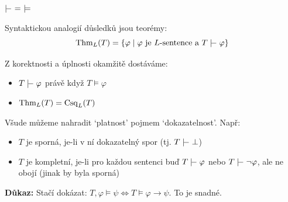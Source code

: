 \documentclass{beamer}
\begin{document}
\begin{frame}{$\proves\ =\ \models$}

    \pause
    Syntaktickou analogií \alert{důsledků} jsou \alert{teorémy}:
    $$
    \Thm_L(T)=\{\varphi\mid \varphi\text{ je $L$-sentence a } T\proves\varphi\}
    $$
    
    \pause
    Z korektnosti a úplnosti okamžitě dostáváme:
        \begin{itemize}
            \item $T\proves\varphi$ právě když $T\models\varphi$
            \item $\operatorname{Thm}_L(T)=\operatorname{Csq}_L(T)$
        \end{itemize}
    
    \pause
    Všude můžeme nahradit `\alert{platnost}' pojmem `\alert{dokazatelnost}'.  Např:
    \begin{itemize}
        \item $T$ je \alert{sporná}, je-li v ní dokazatelný spor (tj. \alert{$T\proves\bot$})
        \item $T$ je \alert{kompletní}, je-li pro každou sentenci buď $T\proves\varphi$ nebo $T\proves\neg\varphi$, ale ne obojí (jinak by byla sporná)
    \end{itemize}

    \pause

    \pause
    \textbf{Důkaz:} Stačí dokázat: $T,\varphi\models\psi\Leftrightarrow T\models\varphi\to\psi$. To je snadné.\hfill\qedsymbol

\end{frame}
\end{document}
